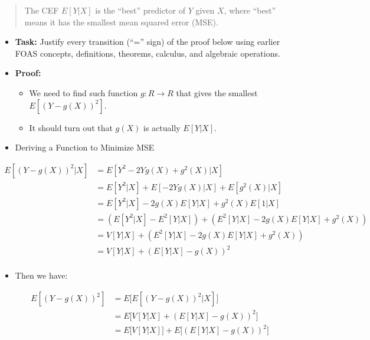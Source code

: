 \documentclass[
]{book}
\providecommand{\tightlist}{%
  \setlength{\itemsep}{0pt}\setlength{\parskip}{0pt}}
\theoremstyle{definition}
\theoremstyle{definition}
\theoremstyle{definition}
\theoremstyle{definition}
\theoremstyle{remark}
\begin{document}
\begin{quote}
The CEF \(E[Y|X]\) is the ``best'' predictor of \(Y\) given \(X\), where ``best'' means it has the smallest mean squared error (MSE).
\end{quote}

\begin{itemize}
\item
  \textbf{Task:} Justify every transition (``='' sign) of the proof below using earlier FOAS concepts, definitions, theorems, calculus, and algebraic operations.
\item
  \textbf{Proof:}

  \begin{itemize}
  \tightlist
  \item
    We need to find such function \(g: R \to R\) that gives the smallest \(E[(Y-g(X))^2]\).
  \item
    It should turn out that \(g(X)\) is actually \(E[Y|X]\).
  \end{itemize}
\item
  Deriving a Function to Minimize MSE
\end{itemize}

\[ 
\begin{aligned}
  E[(Y - g(X))^2|X]
      &= E[Y^2 - 2Yg(X) + g^2(X)|X]                                \\
      &= E[Y^2|X] + E[-2Yg(X)|X] + E[g^2(X)|X]                     \\
      &= E[Y^2|X] - 2g(X)E[Y|X] + g^2(X)E[1|X]                     \\
      &= (E[Y^2|X] - E^2[Y|X]) + (E^2[Y|X] - 2g(X)E[Y|X] + g^2(X)) \\
      &= V[Y|X] + (E^2[Y|X] - 2g(X)E[Y|X] + g^2(X))                \\
      &= V[Y|X] + (E[Y|X] - g(X))^2                                \\
\end{aligned} 
\]

\begin{itemize}
\tightlist
\item
  Then we have:
\end{itemize}

\[
\begin{aligned}
  E[(Y-g(X))^2] &= E\big[E[(Y-g(X))^2|X]\big]     \\ 
    &=E\big[V[Y|X]+(E[Y|X]-g(X))^2\big]           \\
    &=E\big[V[Y|X]\big]+E\big[(E[Y|X]-g(X))^2\big]\\
\end{aligned}
\]
\end{document}
